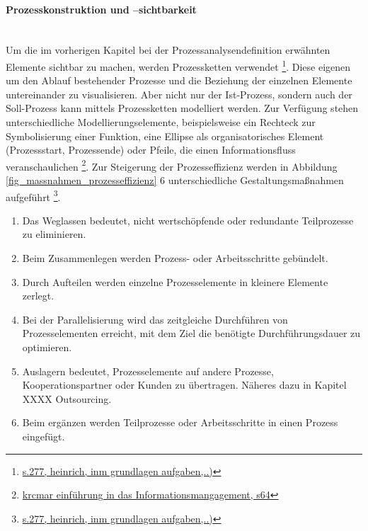 \paragraph{Prozesskonstruktion und –sichtbarkeit}\mbox{}\\
Um die im vorherigen Kapitel bei der Prozessanalysendefinition erwähnten Elemente sichtbar zu machen, werden Prozessketten verwendet \footnote{\url{s.277, heinrich, inm grundlagen aufgaben,..)}}. Diese eigenen um den Ablauf bestehender Prozesse und die Beziehung der einzelnen Elemente untereinander zu visualisieren. Aber nicht nur der Ist-Prozess, sondern auch der Soll-Prozess kann mittels Prozessketten modelliert werden. Zur Verfügung stehen unterschiedliche Modellierungselemente, beispielsweise ein Rechteck zur Symbolisierung einer Funktion, eine Ellipse als organisatorisches Element (Prozessstart, Prozessende) oder Pfeile, die einen Informationsfluss veranschaulichen \footnote{\url{krcmar einführung in das Informationsmangagement, s64}}.
Zur Steigerung der Prozesseffizienz werden in Abbildung \ref{fig_massnahmen_prozesseffizienz}  6 unterschiedliche Gestaltungsmaßnahmen aufgeführt \footnote{\url{s.277, heinrich, inm grundlagen aufgaben,..)}}. 
\begin{enumerate}
    \item Das Weglassen bedeutet, nicht wertschöpfende oder redundante Teilprozesse zu eliminieren.
    \item Beim Zusammenlegen werden Prozess- oder Arbeitsschritte gebündelt.  
    \item Durch Aufteilen werden einzelne Prozesselemente in kleinere Elemente zerlegt. 
    \item Bei der Parallelisierung wird das zeitgleiche Durchführen von Prozesselementen erreicht, mit dem Ziel die benötigte Durchführungsdauer zu optimieren. 
    \item Auslagern bedeutet, Prozesselemente auf andere Prozesse, Kooperationspartner oder Kunden zu übertragen. Näheres dazu in Kapitel XXXX Outsourcing. 
    \item Beim ergänzen werden Teilprozesse oder Arbeitsschritte in einen Prozess eingefügt.
\end{enumerate}


